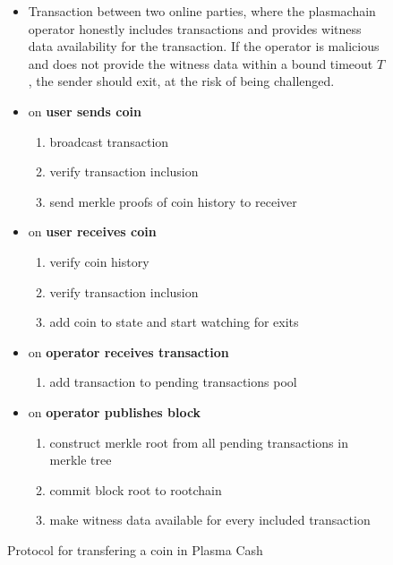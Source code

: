 \begin{figure}
\begin{minipage}{\columnwidth}
\begin{framed}

\begin{itemize}
    \item [] Transaction between two online parties, where the plasmachain operator honestly includes transactions and provides witness data availability for the transaction. If the operator is malicious and does not provide the witness data within a bound timeout $T$, the sender should exit, at the risk of being challenged.
    \item[] on \textbf{user sends coin}
        \begin{enumerate}
            \item broadcast transaction
            \item verify transaction inclusion
            \item send merkle proofs of coin history to receiver
        \end{enumerate}
    \item[] on \textbf{user receives coin}
        \begin{enumerate}
            \item verify coin history
            \item verify transaction inclusion
            \item add coin to state and start watching for exits
        \end{enumerate}
    \item[] on \textbf{operator receives transaction}
        \begin{enumerate}
            \item add transaction to pending transactions pool
        \end{enumerate}
    \item[] on \textbf{operator publishes block}
        \begin{enumerate}
            \item construct merkle root from all pending transactions in merkle tree
            \item commit block root to rootchain
            \item make witness data available for every included transaction
        \end{enumerate}
\end{itemize}

\end{framed}
\end{minipage}
\caption{Protocol for transfering a coin in Plasma Cash}
\label{fig:transfer_coin}
\end{figure}
